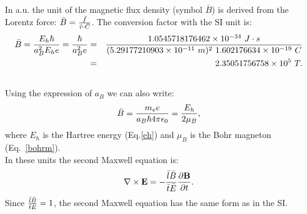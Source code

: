 \documentclass[12pt,a4paper]{article}
\def\hbarf{1.0545718176462\times 10^{-34}}
\def\barl{5.29177210903\times 10^{-11}}
\def\barc{1.602176634\times 10^{-19}}
\def\barb{2.35051756758\times 10^{5}}
\begin{document}
{\color{web-blue} In a.u. the unit of the magnetic flux density 
(symbol $\bar B$) is derived from the Lorentz force: 
$\bar B= {\bar f \over \bar v \cdot
\bar C}$. The conversion factor with the SI unit is:
\begin{eqnarray}
\bar B = {E_h \hbar \over a_B^2 E_h e}={\hbar \over a_B^2 e}&=&
{\hbarf\ J\cdot s \over (\barl\ m)^2\ \barc\ C}\nonumber
\\&=&\barb\ T.
\end{eqnarray}
\\

Using the expression of $a_B$ we can also write:
\begin{equation}
\bar B= {m_e e \over a_B \hbar 4 \pi \epsilon_0}=
{E_h \over 2 \mu_B},
\end{equation}
where $E_h$ is the Hartree energy (Eq.\ref{eh}) and $\mu_B$ is the Bohr 
magneton (Eq.~\ref{bohrm}).
\\
In these units the second Maxwell equation is:
\begin{equation}
\nabla \times {\bf E}=-{\bar l \bar B \over \bar t \bar E} 
{\partial {\bf B} \over \partial t}.
\label{maxwell2gen}
\end{equation}
Since ${\bar l \bar B \over \bar t \bar E}=1$, the second Maxwell
equation has the same form as in the SI.
}
\\
\end{document}
